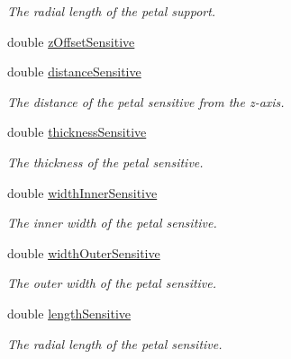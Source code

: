 \begin{DoxyCompactItemize}
\begin{DoxyCompactList}\small\item\em The radial length of the petal support. \item\end{DoxyCompactList}\item 
double \hyperlink{struct_d_d4hep_1_1_d_d_rec_1_1_z_disk_petals_struct_1_1_layer_layout_a9ce8e7e2195166045f83358a3915e96f}{zOffsetSensitive}
\item 
double \hyperlink{struct_d_d4hep_1_1_d_d_rec_1_1_z_disk_petals_struct_1_1_layer_layout_a818dac342e6299ca88f0062682f7008d}{distanceSensitive}
\begin{DoxyCompactList}\small\item\em The distance of the petal sensitive from the z-\/axis. \item\end{DoxyCompactList}\item 
double \hyperlink{struct_d_d4hep_1_1_d_d_rec_1_1_z_disk_petals_struct_1_1_layer_layout_a49622208adfa9ec0dc736f92cfc82a46}{thicknessSensitive}
\begin{DoxyCompactList}\small\item\em The thickness of the petal sensitive. \item\end{DoxyCompactList}\item 
double \hyperlink{struct_d_d4hep_1_1_d_d_rec_1_1_z_disk_petals_struct_1_1_layer_layout_a662855ee8d2089bb1d109fc51e9307f1}{widthInnerSensitive}
\begin{DoxyCompactList}\small\item\em The inner width of the petal sensitive. \item\end{DoxyCompactList}\item 
double \hyperlink{struct_d_d4hep_1_1_d_d_rec_1_1_z_disk_petals_struct_1_1_layer_layout_a091abb2a08a38938db892456c7bdc21e}{widthOuterSensitive}
\begin{DoxyCompactList}\small\item\em The outer width of the petal sensitive. \item\end{DoxyCompactList}\item 
double \hyperlink{struct_d_d4hep_1_1_d_d_rec_1_1_z_disk_petals_struct_1_1_layer_layout_a4508db5622466189d102ac9289c6c3b9}{lengthSensitive}
\begin{DoxyCompactList}\small\item\em The radial length of the petal sensitive. \item\end{DoxyCompactList}\end{DoxyCompactItemize}


